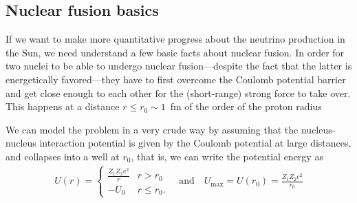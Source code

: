\subsection{Nuclear fusion basics}
\label{sec:nuclear_fusion}

If we want to make more quantitative progress about the neutrino production in the
Sun, we need understand a few basic facts about nuclear fusion.
In order for two nuclei to be able to undergo nuclear fusion---despite the
fact that the latter is energetically favored---they have to first overcome the
Coulomb potential barrier and get close enough to each other for the (short-range)
strong force to take over. This happens at a distance $r \leq r_0 \sim 1$~fm
of the order of the proton radius

We can model the problem in a very crude way by assuming that the nucleus-nucleus
interaction potential is given by the Coulomb potential at large distances, and
collapses into a well at $r_0$, that is, we can write the potential energy
as
\begin{align*}
  U(r) =
  \begin{cases}
    \displaystyle\frac{Z_1 Z_2 e^2}{r} & r > r_0\\
    -U_0 & r \leq r_0.
  \end{cases}
  \quad\text{and}\quad
  U_\text{max} = U(r_0) = \frac{Z_1 Z_2 e^2}{r_0}
\end{align*}

\begin{marginfigure}
  
  \caption{Schematic representation of the central potential describing the process
  of nuclear fusion process fusion as a well and a Coulomb barrier. The radius
  $r_1$ where the kinetic energy $E$ of the nucleus equals the potential energy $U(r)$ is
  defined by the condition
  \begin{align*}
  U(r_1) = E \quad\text{or}\quad
  r_1 = \frac{Z_1 Z_2 e^2}{E}.
  \end{align*}
  Note that for our particular case the figure is not quite to scale: since the kinetic
  energy of the nucleus is typically much smaller than the height of the Coulomb barrier,
  we have $r_0 \ll r_1$.}
  \label{fig:pp_fusion}
\end{marginfigure}

